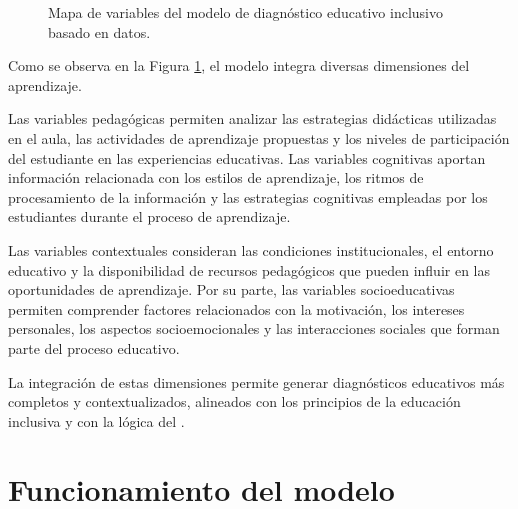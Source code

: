 \begin{refsection}
\begin{figure}[htbp]
{
}
\caption{Mapa de variables del modelo de diagnóstico educativo inclusivo basado en datos.}
\label{fig:variables-diagnostico}
\end{figure}

Como se observa en la Figura \ref{fig:variables-diagnostico}, el modelo integra diversas dimensiones del aprendizaje.

Las variables pedagógicas permiten analizar las estrategias didácticas utilizadas en el aula, las actividades de aprendizaje propuestas y los niveles de participación del estudiante en las experiencias educativas. Las variables cognitivas aportan información relacionada con los estilos de aprendizaje, los ritmos de procesamiento de la información y las estrategias cognitivas empleadas por los estudiantes durante el proceso de aprendizaje.

Las variables contextuales consideran las condiciones institucionales, el entorno educativo y la disponibilidad de recursos pedagógicos que pueden influir en las oportunidades de aprendizaje. Por su parte, las variables socioeducativas permiten comprender factores relacionados con la motivación, los intereses personales, los aspectos socioemocionales y las interacciones sociales que forman parte del proceso educativo.

La integración de estas dimensiones permite generar diagnósticos educativos más completos y contextualizados, alineados con los principios de la educación inclusiva y con la lógica del \DUA.

\section{Funcionamiento del modelo}


\end{refsection}
